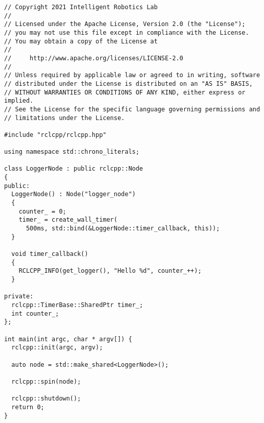  \footnotesize
\begin{tcolorbox}[sharp corners, colframe=gray!80, colback=LightGray, left=0pt, top=0pt, bottom=0pt, title=\texttt{br2\_basics/src/logger\_class.cpp}]
  \begin{verbatim}
// Copyright 2021 Intelligent Robotics Lab
//
// Licensed under the Apache License, Version 2.0 (the "License");
// you may not use this file except in compliance with the License.
// You may obtain a copy of the License at
//
//     http://www.apache.org/licenses/LICENSE-2.0
//
// Unless required by applicable law or agreed to in writing, software
// distributed under the License is distributed on an "AS IS" BASIS,
// WITHOUT WARRANTIES OR CONDITIONS OF ANY KIND, either express or implied.
// See the License for the specific language governing permissions and
// limitations under the License.

#include "rclcpp/rclcpp.hpp"

using namespace std::chrono_literals;

class LoggerNode : public rclcpp::Node
{
public:
  LoggerNode() : Node("logger_node")
  {
    counter_ = 0;
    timer_ = create_wall_timer(
      500ms, std::bind(&LoggerNode::timer_callback, this));
  }

  void timer_callback()
  {
    RCLCPP_INFO(get_logger(), "Hello %d", counter_++);
  }

private:
  rclcpp::TimerBase::SharedPtr timer_;
  int counter_;
};

int main(int argc, char * argv[]) {
  rclcpp::init(argc, argv);

  auto node = std::make_shared<LoggerNode>();

  rclcpp::spin(node);

  rclcpp::shutdown();
  return 0;
}    \end{verbatim}
    \end{tcolorbox}
  \normalsize

